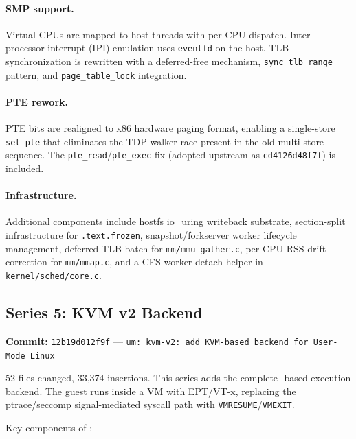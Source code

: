 \paragraph{SMP support.}
Virtual CPUs are mapped to host threads with per-CPU dispatch.
Inter-processor interrupt (IPI) emulation uses \texttt{eventfd} on
the host.  TLB synchronization is rewritten with a deferred-free
mechanism, \texttt{sync\_tlb\_range} pattern, and
\texttt{page\_table\_lock} integration.

\paragraph{PTE rework.}
PTE bits are realigned to x86 hardware paging format, enabling a
single-store \texttt{set\_pte} that eliminates the TDP walker race
present in the old multi-store sequence.  The \texttt{pte\_read}/\texttt{pte\_exec}
fix (adopted upstream as \texttt{cd4126d48f7f}) is included.

\paragraph{Infrastructure.}
Additional components include hostfs io\_uring writeback substrate,
section-split infrastructure for \texttt{.text.frozen},
snapshot/forkserver worker lifecycle management, deferred TLB batch
for \texttt{mm/mmu\_gather.c}, per-CPU RSS drift correction for
\texttt{mm/mmap.c}, and a CFS worker-detach helper in
\texttt{kernel/sched/core.c}.


\subsection{Series 5: KVM v2 Backend}
\label{sec:v2-series5}

\textbf{Commit:} \texttt{12b19d012f9f} ---
\texttt{um: kvm-v2: add KVM-based backend for User-Mode Linux}

52 files changed, 33,374 insertions.  This series adds the complete
\KVM{}-based execution backend.  The guest runs inside a \KVM{} VM
with EPT/VT-x, replacing the ptrace/seccomp signal-mediated syscall
path with \texttt{VMRESUME}/\texttt{VMEXIT}.

Key components of :

